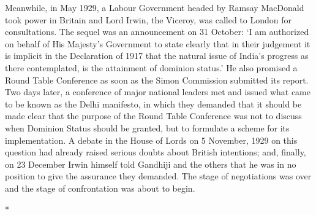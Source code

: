 Meanwhile, in May 1929, a Labour Government headed by Ramsay MacDonald took power in Britain and Lord Irwin, the Viceroy, was called to London for consultations. The sequel was an announcement on 31 October: `I am authorized on behalf of His Majesty's Government to state clearly that in their judgement it is implicit in the Declaration of 1917 that the natural issue of India's progress as there contemplated, is the attainment of dominion status.' He also promised a Round Table Conference as soon as the Simon Commission submitted its report. Two days later, a conference of major national leaders met and issued what came to be known as the Delhi manifesto, in which they demanded that it should be made clear that the purpose of the Round Table Conference was not to discuss when Dominion Status should be granted, but to formulate a scheme for its implementation. A debate in the House of Lords on 5 November, 1929 on this question had already raised serious doubts about British intentions; and, finally, on 23 December Irwin himself told Gandhiji and the others that he was in no position to give the assurance they demanded. The stage of negotiations was over and the stage of confrontation was about to begin.

\begin{center}*\end{center}

\paragraph*{}


